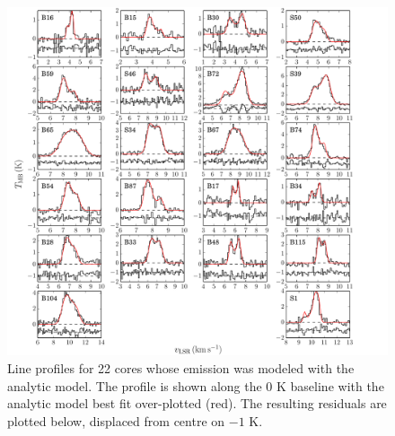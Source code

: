 \documentclass[iop,twocolappendix]{emulateapj}
\begin{document}
\begin{appendix}
\begin{figure}
\includegraphics[width=20cm]{AllModels.pdf}
\caption{Line profiles for 22 cores whose {\HCO} emission was modeled with the analytic {\Hill} model. The {\HCO} profile is shown along the 0 K baseline with the analytic model best fit over-plotted (red). The resulting residuals are plotted below, displaced from centre on $-1$ K.}
\label{fig:modelplots}
\end{figure}

\end{appendix}
\end{document}
